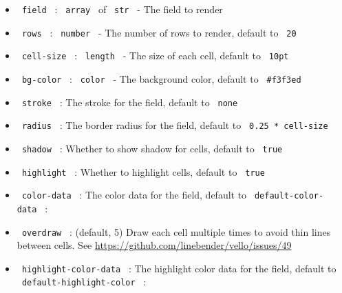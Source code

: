 \begin{itemize}
\tightlist
\item
  \texttt{\ field\ } : \texttt{\ array\ } of \texttt{\ str\ } - The
  field to render
\item
  \texttt{\ rows\ } : \texttt{\ number\ } - The number of rows to
  render, default to \texttt{\ 20\ }
\item
  \texttt{\ cell-size\ } : \texttt{\ length\ } - The size of each cell,
  default to \texttt{\ 10pt\ }
\item
  \texttt{\ bg-color\ } : \texttt{\ color\ } - The background color,
  default to \texttt{\ \#f3f3ed\ }
\item
  \texttt{\ stroke\ } : The stroke for the field, default to
  \texttt{\ none\ }
\item
  \texttt{\ radius\ } : The border radius for the field, default to
  \texttt{\ 0.25\ *\ cell-size\ }
\item
  \texttt{\ shadow\ } : Whether to show shadow for cells, default to
  \texttt{\ true\ }
\item
  \texttt{\ highlight\ } : Whether to highlight cells, default to
  \texttt{\ true\ }
\item
  \texttt{\ color-data\ } : The color data for the field, default to
  \texttt{\ default-color-data\ } :
\item
  \texttt{\ overdraw\ } : (default, 5) Draw each cell multiple times to
  avoid thin lines between cells. See
  \url{https://github.com/linebender/vello/issues/49}
\end{itemize}

\begin{Shaded}
\begin{Highlighting}[]
\NormalTok{)}
\end{Highlighting}
\end{Shaded}

\begin{itemize}
\tightlist
\item
  \texttt{\ highlight-color-data\ } : The highlight color data for the
  field, default to \texttt{\ default-highlight-color\ } :
\end{itemize}

\begin{Shaded}
\begin{Highlighting}[]
\NormalTok{)}
\end{Highlighting}
\end{Shaded}

